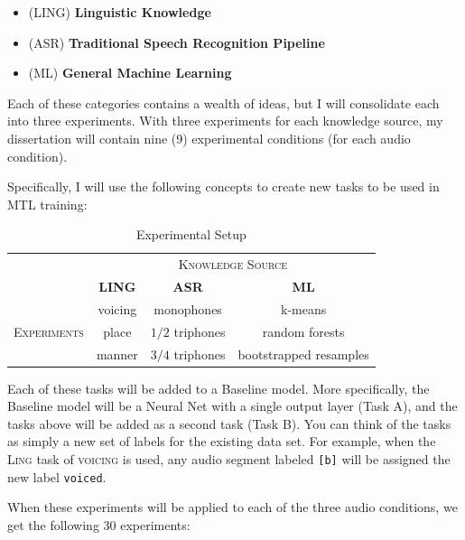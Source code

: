 \documentclass[10pt,a4paper]{article}
\begin{document}
\begin{itemize}
\item  (\textsc{LING}) \textbf{Linguistic Knowledge} 
\item (\textsc{ASR}) \textbf{Traditional Speech Recognition Pipeline}
\item (\textsc{ML}) \textbf{General Machine Learning}
\end{itemize}


Each of these categories contains a wealth of ideas, but I will consolidate each into three experiments. With three experiments for each knowledge source, my dissertation will contain nine (9) experimental conditions (for each audio condition).

Specifically, I will use the following concepts to create new tasks to be used in MTL training:

\begin{table}[!htbp]
  \centering
  \begin{adjustbox}{width=.55\textwidth}
    \begin{tabular}{cccc}
      \toprule
      & \multicolumn{3}{c}{\textsc{Knowledge Source}}\\
      & \textbf{LING} & \textbf{ASR} & \textbf{ML}\\
      \midrule
      \multirow{3}{*}{\textsc{Experiments}} & voicing & monophones &  k-means \\
      & place & $1/2$ triphones & random forests  \\
      & manner & $3/4$ triphones &  bootstrapped resamples  \\
      \bottomrule
    \end{tabular}
    \label{table:data}
  \end{adjustbox}
  
  \caption{Experimental Setup}
  
\end{table}


Each of these tasks will be added to a Baseline model. More specifically, the Baseline model will be a Neural Net with a single output layer (Task A), and the tasks above will be added as a second task (Task B). You can think of the tasks as simply a new set of labels for the existing data set. For example, when the \textsc{Ling} task of \textsc{voicing} is used, any audio segment labeled \texttt{[b]} will be assigned the new label \texttt{voiced}.

When these experiments will be applied to each of the three audio conditions, we get the following 30 experiments:
\end{document}

